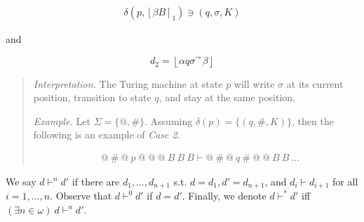 \documentclass[a4paper, 12pt]{article}
\begin{document}
\begin{align*}
    \delta \left( p, \left[ \beta B \right]_1  \right) \ni (q, \sigma, K)
\end{align*}

and 

$$d_2 = \left\lfloor \alpha q \sigma {}^{\curvearrowright} \beta  \right\rfloor $$

\small 
\begin{quote}
    \textit{Interpretation.} The Turing machine at state $p$ will write $\sigma$
    at its current position, transition to state $q$, and stay at the same
    position.

    \textit{Example.} Let $\Sigma = \{ @, \#\}$. Assuming $\delta (p) = \{ (q,
    \#, K) \}$, then the following is an example of
    \textit{Case 2}.
    
    \begin{align*}
        &@ ~ \# ~ @ ~ p ~ @ ~ @ ~ @ ~ B ~ B ~ B \vdash  @ ~ \# ~@ ~ q ~ \# ~  @ ~
        @~ B ~ B
        ~ \ldots
    \end{align*}
\end{quote}
\normalsize 

We say $d \vdash^n d'$ if there are $d_1, \ldots, d_{n+1}$ s.t. $d = d_1, d' =
d_{n+1}$, and $d_i \vdash d_{i + 1}$ for all $i = 1, \ldots, n$. Observe that $d
\vdash^0 d'$ if $d = d'$. Finally, we denote $d \vdash^{*} d'$ iff $(\exists n
\in \omega) ~ d \vdash^n d'$.
\end{document}
